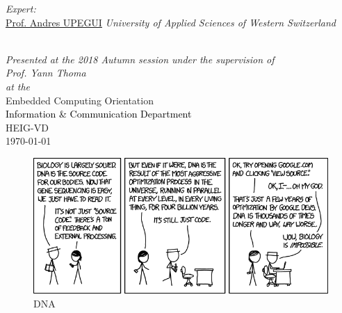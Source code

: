 \documentclass[
11pt, %
english, %
singlespacing, %
headsepline, %
]{MastersDoctoralThesis} %
\begin{document}
\begin{titlepage}
\begin{center}
\begin{minipage}[t]{0.4\textwidth}
\begin{flushright}
\emph{Expert:} \\
\href{http://www.jamessmith.com}{\textcolor{bleu}{Prof. Andres UPEGUI}} \linebreak 
\textit{\small{University of Applied Sciences of Western Switzerland}}
\end{flushright}
\end{minipage}\\[1.5cm]

\large \textit{Presented at the 2018 Autumn session under the supervision \linebreak of \\ \vspace*{3mm} Prof. Yann Thoma}\\[0.3cm] %
\textit{at the}\\[0.4cm]\textcolor{bleu}{
Embedded Computing Orientation \\ \vspace*{3mm}
\textcolor{black}{Information \& Communication Department} \\ \vspace*{3mm} HEIG-VD}\\[1cm] %
{\large \today}\\ %
\vfill
\end{center}
\end{titlepage}

\thispagestyle{empty}
\newpage

\vspace*{0.2\textheight}


\begin{figure}[h]
	\centering

	\includegraphics[scale = 0.6]{Figures/xkcd.png}
		\captionsetup{labelformat=empty}%
	\caption{DNA}
	\label{XKCD}
\end{figure}
\end{document}
